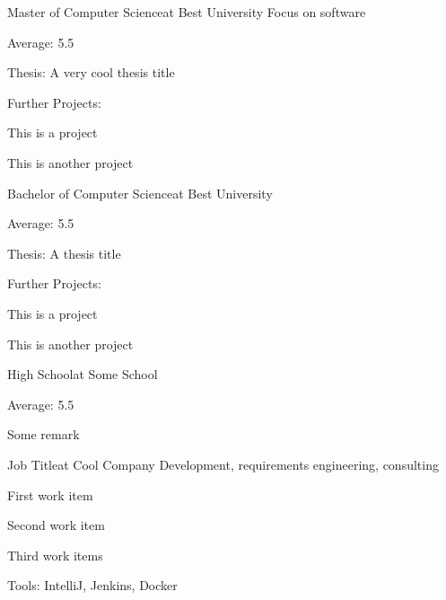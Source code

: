     \begin{minipage}{0.7125\textwidth} %
        \begin{tcolorbox}[height=0.8\textheight, grow to left by=0.55cm,colframe=white,colback=white]

            {Master of Computer Science}{at Best University}
            {Focus on software}
            { \begin{compactitem}[-]
                \item Average: 5.5
                \item \raggedright{Thesis: A very cool thesis title}
            \end{compactitem}
            Further Projects:
            \begin{compactitem}[-]
                \item This is a project
                \item This is another project
            \end{compactitem}
            }

            {Bachelor of Computer Science}{at Best University}
            {\begin{compactitem}[-]
                \item Average: 5.5
                \item Thesis: A thesis title
            \end{compactitem}
            Further Projects:
            \begin{compactitem}[-]
                \item This is a project
                \item This is another project
            \end{compactitem}
            }
        
            {High School}{at Some School}
            {\begin{compactitem}[-]
                \item {Average: 5.5}
                \item Some remark 
            \end{compactitem}}

            {Job Title}{at Cool Company}
            {Development, requirements engineering, consulting}
            {\begin{compactitem}[-]
                \item First work item
                \item Second work item
                \item Third work items
                \item Tools: IntelliJ, Jenkins, Docker
            \end{compactitem}
            }
            

\end{tcolorbox}
\end{minipage}
